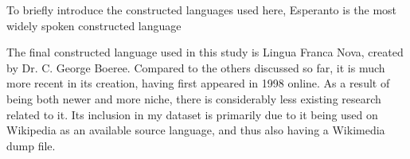 \documentclass[12pt,a4paper]{article}
\numberwithin{figure}{section}
\numberwithin{table}{section}
\numberwithin{definition}{section}
\begin{document}

To briefly introduce the constructed languages used here, Esperanto is the most widely spoken constructed language


The final constructed language used in this study is Lingua Franca Nova, created by Dr. C. George Boeree. Compared to the others discussed so far, it is much more recent in its creation, having first appeared in 1998 online. As a result of being both newer and more niche, there is considerably less existing research related to it. Its inclusion in my dataset is primarily due to it being used on Wikipedia as an available source language, and thus also having a Wikimedia dump file.
\end{document}
